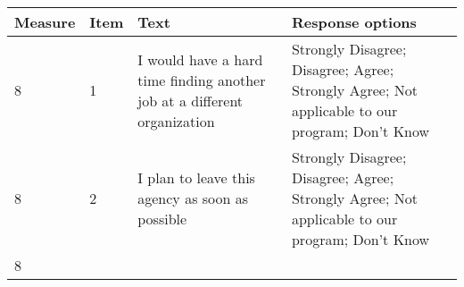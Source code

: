 \documentclass[]{article}
\begin{document}
\begin{longtable}[]{@{}llll@{}}
\toprule
\begin{minipage}[b]{0.05\columnwidth}\raggedright\strut
Measure\strut
\end{minipage} & \begin{minipage}[b]{0.04\columnwidth}\raggedright\strut
Item\strut
\end{minipage} & \begin{minipage}[b]{0.40\columnwidth}\raggedright\strut
Text\strut
\end{minipage} & \begin{minipage}[b]{0.40\columnwidth}\raggedright\strut
Response options\strut
\end{minipage}\tabularnewline
\midrule
\endhead
\begin{minipage}[t]{0.05\columnwidth}\raggedright\strut
8\strut
\end{minipage} & \begin{minipage}[t]{0.04\columnwidth}\raggedright\strut
1\strut
\end{minipage} & \begin{minipage}[t]{0.40\columnwidth}\raggedright\strut
I would have a hard time finding another job at a different
organization\strut
\end{minipage} & \begin{minipage}[t]{0.40\columnwidth}\raggedright\strut
Strongly Disagree; Disagree; Agree; Strongly Agree; Not applicable to
our program; Don't Know\strut
\end{minipage}\tabularnewline
\begin{minipage}[t]{0.05\columnwidth}\raggedright\strut
8\strut
\end{minipage} & \begin{minipage}[t]{0.04\columnwidth}\raggedright\strut
2\strut
\end{minipage} & \begin{minipage}[t]{0.40\columnwidth}\raggedright\strut
I plan to leave this agency as soon as possible\strut
\end{minipage} & \begin{minipage}[t]{0.40\columnwidth}\raggedright\strut
Strongly Disagree; Disagree; Agree; Strongly Agree; Not applicable to
our program; Don't Know\strut
\end{minipage}\tabularnewline
\begin{minipage}[t]{0.05\columnwidth}\raggedright\strut
8\strut
\end{minipage} & \begin{minipage}[t]{0.04\columnwidth}\raggedright\strut

\end{minipage}
\end{longtable}
\end{document}
